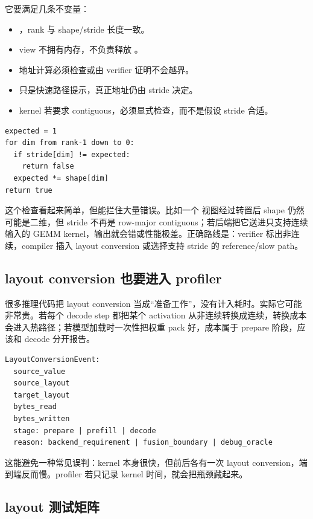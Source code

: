 它要满足几条不变量：

\begin{itemize}
  \item {}，rank 与 shape/stride 长度一致。
  \item view 不拥有内存，不负责释放 。
  \item 地址计算必须检查或由 verifier 证明不会越界。
  \item {} 只是快速路径提示，真正地址仍由 stride 决定。
  \item kernel 若要求 contiguous，必须显式检查，而不是假设 stride 合适。
\end{itemize}

\begin{lstlisting}[numbers=none,caption={contiguous 检查的语义}]
expected = 1
for dim from rank-1 down to 0:
  if stride[dim] != expected:
    return false
  expected *= shape[dim]
return true
\end{lstlisting}

这个检查看起来简单，但能拦住大量错误。比如一个 \code{[T,H]} 视图经过转置后 shape 仍然可能是二维，但 stride 不再是 row-major contiguous；若后端把它送进只支持连续输入的 GEMM kernel，输出就会错或性能极差。正确路线是：verifier 标出非连续，compiler 插入 layout conversion 或选择支持 stride 的 reference/slow path。

\subsection{layout conversion 也要进入 profiler}

很多推理代码把 layout conversion 当成“准备工作”，没有计入耗时。实际它可能非常贵。若每个 decode step 都把某个 activation 从非连续转换成连续，转换成本会进入热路径；若模型加载时一次性把权重 pack 好，成本属于 prepare 阶段，应该和 decode 分开报告。

\begin{lstlisting}[numbers=none,caption={layout conversion event 字段}]
LayoutConversionEvent:
  source_value
  source_layout
  target_layout
  bytes_read
  bytes_written
  stage: prepare | prefill | decode
  reason: backend_requirement | fusion_boundary | debug_oracle
\end{lstlisting}

这能避免一种常见误判：kernel 本身很快，但前后各有一次 layout conversion，端到端反而慢。profiler 若只记录 kernel 时间，就会把瓶颈藏起来。

\subsection{layout 测试矩阵}

